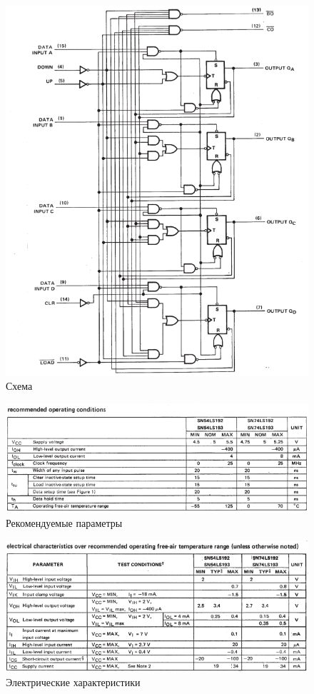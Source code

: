 \begin{figure}[H]
	\centering
	\includegraphics[width=0.95\linewidth]{imgs/14/14_sh}
	\caption{Схема}
	\label{fig:14_sh}
\end{figure}

\begin{figure}[H]
	\centering
	\includegraphics[width=0.8\linewidth]{imgs/14/14_rec}
	\caption{Рекомендуемые параметры}
	\label{fig:14_rec}
\end{figure}

\begin{figure}[H]
	\centering
	\includegraphics[width=0.95\linewidth]{imgs/14/14_ch}
	\caption{Электрические характеристики}
	\label{fig:14_ch}
\end{figure}

